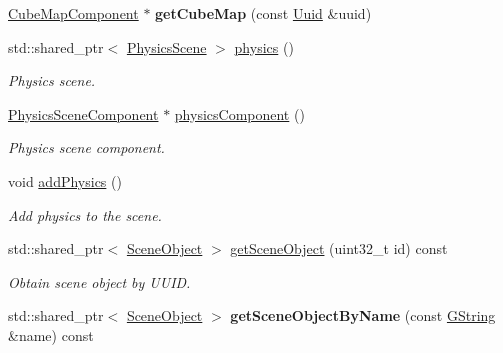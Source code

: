 \begin{Indent}
\begin{DoxyCompactItemize}
\mbox{\hyperlink{classrev_1_1_cube_map_component}{Cube\+Map\+Component}} $\ast$ {\bfseries get\+Cube\+Map} (const \mbox{\hyperlink{classrev_1_1_uuid}{Uuid}} \&uuid)
\item 
\mbox{\label{classrev_1_1_scene_a1219b5b7c2bf10da6d22eaeefcd8fc42}} 
std\+::shared\+\_\+ptr$<$ \mbox{\hyperlink{classrev_1_1_physics_scene}{Physics\+Scene}} $>$ \mbox{\hyperlink{classrev_1_1_scene_a1219b5b7c2bf10da6d22eaeefcd8fc42}{physics}} ()
\begin{DoxyCompactList}\small\item\em Physics scene. \end{DoxyCompactList}\item 
\mbox{\label{classrev_1_1_scene_a3216094681ea373d58df53f4468b846f}} 
\mbox{\hyperlink{classrev_1_1_physics_scene_component}{Physics\+Scene\+Component}} $\ast$ \mbox{\hyperlink{classrev_1_1_scene_a3216094681ea373d58df53f4468b846f}{physics\+Component}} ()
\begin{DoxyCompactList}\small\item\em Physics scene component. \end{DoxyCompactList}\item 
\mbox{\label{classrev_1_1_scene_a69816677f641c352b90f88c625177b8c}} 
void \mbox{\hyperlink{classrev_1_1_scene_a69816677f641c352b90f88c625177b8c}{add\+Physics}} ()
\begin{DoxyCompactList}\small\item\em Add physics to the scene. \end{DoxyCompactList}\item 
\mbox{\label{classrev_1_1_scene_a2d9b518d5cf16a06c178e884c5466b7a}} 
std\+::shared\+\_\+ptr$<$ \mbox{\hyperlink{classrev_1_1_scene_object}{Scene\+Object}} $>$ \mbox{\hyperlink{classrev_1_1_scene_a2d9b518d5cf16a06c178e884c5466b7a}{get\+Scene\+Object}} (uint32\+\_\+t id) const
\begin{DoxyCompactList}\small\item\em Obtain scene object by U\+U\+ID. \end{DoxyCompactList}\item 
\mbox{\label{classrev_1_1_scene_a2656b1e943fb5834ff499cc82807b9bd}} 
std\+::shared\+\_\+ptr$<$ \mbox{\hyperlink{classrev_1_1_scene_object}{Scene\+Object}} $>$ {\bfseries get\+Scene\+Object\+By\+Name} (const \mbox{\hyperlink{classrev_1_1_g_string}{G\+String}} \&name) const

\end{DoxyCompactItemize}
\end{Indent}
